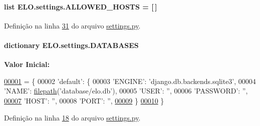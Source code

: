 \paragraph[{A\+L\+L\+O\+W\+E\+D\+\_\+\+H\+O\+S\+T\+S}]{\setlength{\rightskip}{0pt plus 5cm}list E\+L\+O.\+settings.\+A\+L\+L\+O\+W\+E\+D\+\_\+\+H\+O\+S\+T\+S = \mbox{[}$\,$\mbox{]}}\label{namespaceELO_1_1settings_afd72644768367440ae1a89e9fe95cde5}


Definição na linha \hyperlink{settings_8py_source_l00031}{31} do arquivo \hyperlink{settings_8py_source}{settings.\+py}.

\hypertarget{namespaceELO_1_1settings_a91ed1425b7f1cf041960832ce5b54b6e}{}
\paragraph[{D\+A\+T\+A\+B\+A\+S\+E\+S}]{\setlength{\rightskip}{0pt plus 5cm}dictionary E\+L\+O.\+settings.\+D\+A\+T\+A\+B\+A\+S\+E\+S}\label{namespaceELO_1_1settings_a91ed1425b7f1cf041960832ce5b54b6e}
{\bfseries Valor Inicial\+:}
\begin{DoxyCode}
\hypertarget{namespaceELO_1_1settings_l00001}{}\hyperlink{namespaceELO_1_1settings}{00001} = \{
00002     \textcolor{stringliteral}{'default'}: \{
00003         \textcolor{stringliteral}{'ENGINE'}: \textcolor{stringliteral}{'django.db.backends.sqlite3'}, 
00004         \textcolor{stringliteral}{'NAME'}: \hyperlink{namespaceELO_1_1settings_a7730264ddd478343e0f282f36d4a5ab4}{filepath}(\textcolor{stringliteral}{'database/elo.db'}),
00005         \textcolor{stringliteral}{'USER'}: \textcolor{stringliteral}{''},
00006         \textcolor{stringliteral}{'PASSWORD'}: \textcolor{stringliteral}{''},
\hypertarget{namespaceELO_1_1settings_l00007}{}\hyperlink{namespaceELO_1_1settings_a7730264ddd478343e0f282f36d4a5ab4}{00007}         \textcolor{stringliteral}{'HOST'}: \textcolor{stringliteral}{''},
00008         \textcolor{stringliteral}{'PORT'}: \textcolor{stringliteral}{''},
\hypertarget{namespaceELO_1_1settings_l00009}{}\hyperlink{namespaceELO_1_1settings_a62f457ac29cc6f3e85282c71ce3b4f26}{00009}     \}
\hypertarget{namespaceELO_1_1settings_l00010}{}\hyperlink{namespaceELO_1_1settings_a014930e0bf77feccc65c20212593381e}{00010} \}
\end{DoxyCode}


Definição na linha \hyperlink{settings_8py_source_l00018}{18} do arquivo \hyperlink{settings_8py_source}{settings.\+py}.

